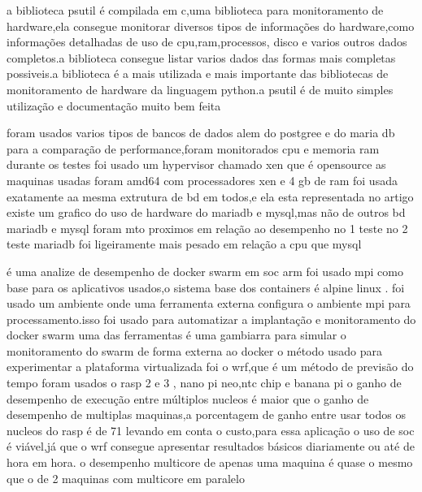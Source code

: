 \documentclass[
	12pt,				%
	openright,			%
	oneside,			%
	a4paper,			%
	english,			%
	french,				%
	spanish,			%
	brazil,				%
	]{abntex2}
\begin{document}
\cite{faker}

a biblioteca psutil é compilada em c,uma biblioteca para monitoramento de hardware,ela consegue monitorar diversos tipos de informações do hardware,como informações detalhadas de uso de cpu,ram,processos,
disco e varios outros dados completos.a biblioteca consegue listar varios dados das formas mais completas possiveis.a biblioteca é a mais utilizada e mais importante das bibliotecas de monitoramento de hardware da linguagem python.a psutil é de muito simples utilização e documentação muito bem feita
\cite{psutil}


foram usados varios tipos de bancos de dados alem do postgree e do maria db para a comparação de performance,foram monitorados cpu e memoria ram
durante os testes foi usado um hypervisor chamado xen que é opensource
as maquinas usadas foram amd64 com processadores xen e 4 gb de ram
foi usada exatamente aa mesma extrutura de bd em todos,e ela esta representada no artigo
existe um grafico do uso de hardware do mariadb e mysql,mas não de outros bd
mariadb e mysql foram mto proximos em relação ao desempenho no 1 teste
no 2 teste mariadb foi ligeiramente mais pesado em relação a cpu que mysql
\cite{MariaDBMySQLOLTP}

é uma analize de desempenho de docker swarm em soc arm 
foi usado mpi como base para os aplicativos usados,o sistema base dos containers é alpine linux .
foi usado um ambiente onde uma ferramenta externa configura o ambiente mpi para processamento.isso foi usado para automatizar a implantação e monitoramento do docker swarm 
uma das ferramentas é uma gambiarra para simular o monitoramento do swarm de forma externa ao docker
o método usado para experimentar a plataforma virtualizada foi o wrf,que é um método de previsão do tempo
foram usados o rasp 2 e 3 , nano pi neo,ntc chip e banana pi
o ganho de desempenho de execução entre múltiplos nucleos é maior que o ganho de desempenho de multiplas maquinas,a porcentagem de ganho entre usar todos os nucleos do rasp é de 71%
levando em conta o custo,para essa aplicação o uso de soc é viável,já que o wrf consegue apresentar resultados básicos diariamente ou até de hora em hora.
o desempenho multicore de apenas uma maquina é quase o mesmo que o de 2 maquinas com multicore em paralelo
\cite{DockerSwarmsocmpi}
\end{document}
